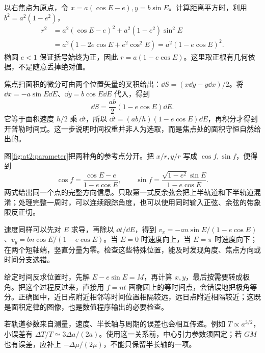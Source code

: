  以右焦点为原点，令 $x=a(\cos E-e),y=b\sin E$。计算距离平方时，利用 $b^2=a^2(1-e^2)$，
  \begin{align*}
  r^2&=a^2(\cos E-e)^2+a^2(1-e^2)\sin^2E\\
  &=a^2(1-2e\cos E+e^2\cos^2E)=a^2(1-e\cos E)^2.
  \end{align*}
  椭圆 $e<1$ 保证括号始终为正，因此 $r=a(1-e\cos E)$。这里取正根有几何依据，不是随意丢掉绝对值。

  焦点扫面积的微分可由两个位置矢量的叉积给出：$\dd S=(x\dd y-y\dd x)/2$。将 $\dd x=-a\sin E\dd E$、$\dd y=b\cos E\dd E$ 代入，得到
  \[\dd S=\frac{ab}{2}(1-e\cos E)\dd E.
  \]
  它等于面积速度 $h/2$ 乘 $\dd t$，所以 $\dd t=(ab/h)(1-e\cos E)\dd E$，再积分才得到开普勒时间式。这一步说明时间权重并非人为选取，而是焦点处的面积守恒自然给出的。
  

  图\ref{fig:at2:parameter}把两种角的参考点分开。把 $x/r,y/r$ 写成 $\cos f,\sin f$，便得到
  \[\cos f=\frac{\cos E-e}{1-e\cos E},\qquad
  \sin f=\frac{\sqrt{1-e^2}\sin E}{1-e\cos E}.\]
  两式给出同一个点的完整方向信息。只取第一式反余弦会把上半轨道和下半轨道混淆；处理完整一周时，可以连续跟踪角度，也可以使用同时输入正弦、余弦的带象限反正切。

  速度同样可以先对 $E$ 求导，再除以 $\dd t/\dd E$，得到 $v_x=-an\sin E/(1-e\cos E)$、$v_y=bn\cos E/(1-e\cos E)$。当 $E=0$ 时速度向上，当 $E=\pi$ 时速度向下；在两个短轴端，竖直分量为零。检查这些特殊位置，能及时发现角度、焦点方向或时间分支选错。

  给定时间反求位置时，先解 $E-e\sin E=M$，再计算 $x,y$，最后按需要转成极角。把这个过程反过来，直接用 $f=nt$ 画椭圆上的等时间点，会错误地把极角等分。正确图中，近日点附近相邻等时间位置相隔较远，远日点附近相隔较近；这既是面积定律的图像，也是数值程序输出的必要检查。

  若轨道参数来自测量，速度、半长轴与周期的误差也会相互传递。例如 $T\propto a^{3/2}$，小误差有 $\Delta T/T\simeq3\Delta a/(2a)$。使用这一关系前，中心引力参数须固定；若 $GM$ 也有误差，应补上 $-\Delta\mu/(2\mu)$，不能只保留半长轴的一项。
